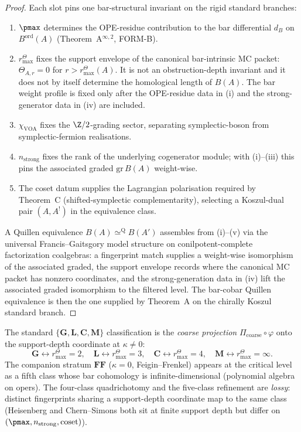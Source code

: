 \begin{proof}
Each slot pins one bar-structural invariant on the rigid standard
branches:
\begin{enumerate}
 \item[(i)] $\pmax$ determines the OPE-residue contribution to the bar differential $d_B$ on $B^{\mathrm{ord}}(A)$ (Theorem~A$^{\infty,2}$, FORM-B).
 \item[(ii)] \(r^\Theta_{\max}\) fixes the support envelope of the
 canonical bar-intrinsic MC packet:
 \(\Theta_{A,r}=0\) for \(r>r^\Theta_{\max}(A)\).  It is not an
 obstruction-depth invariant and it does not by itself determine the
 homological length of \(B(A)\).  The bar weight profile is fixed only
 after the OPE-residue data in (i) and the strong-generator data in
 (iv) are included.
 \item[(iii)] $\chi_{\mathrm{VOA}}$ fixes the $\Z/2$-grading sector, separating symplectic-boson from symplectic-fermion realisations.
 \item[(iv)] $n_{\mathrm{strong}}$ fixes the rank of the underlying cogenerator module; with (i)--(iii) this pins the associated graded $\mathrm{gr}\, B(A)$ weight-wise.
 \item[(v)] The coset datum supplies the Lagrangian polarisation required by Theorem~C (shifted-symplectic complementarity), selecting a Koszul-dual pair $(A, A^!)$ in the equivalence class.
\end{enumerate}
A Quillen equivalence $B(A) \simeq^{\mathrm{Q}} B(A')$ assembles from
(i)--(v) via the universal Francis--Gaitsgory model structure on
conilpotent-complete factorization coalgebras: a fingerprint match
supplies a weight-wise isomorphism of the associated graded, the
support envelope records where the canonical MC packet has nonzero
coordinates, and the strong-generation data in (iv) lift the associated
graded isomorphism to the filtered level. The bar-cobar Quillen
equivalence is then the one supplied by Theorem~A on the chirally
Koszul standard branch.
\end{proof}

\begin{remark}
\label{rem:five-class-coarse-projection}
The standard $\{\mathbf{G},\mathbf{L},\mathbf{C},\mathbf{M}\}$ classification is the \emph{coarse projection} $\Pi_{\mathrm{coarse}} \circ \varphi$ onto the support-depth coordinate at $\kappa \neq 0$:
\[
 \mathbf{G} \leftrightarrow r^\Theta_{\max} = 2, \quad
 \mathbf{L} \leftrightarrow r^\Theta_{\max} = 3, \quad
 \mathbf{C} \leftrightarrow r^\Theta_{\max} = 4, \quad
 \mathbf{M} \leftrightarrow r^\Theta_{\max} = \infty.
\]
The companion stratum $\mathbf{FF}$ ($\kappa = 0$, Feigin--Frenkel) appears at the critical level as a fifth class whose bar cohomology is infinite-dimensional (polynomial algebra on opers). The four-class quadrichotomy and the five-class refinement are \emph{lossy}: distinct fingerprints sharing a support-depth coordinate map to the same class (Heisenberg and Chern--Simons both sit at finite support depth but differ on $(\pmax, n_{\mathrm{strong}}, \mathrm{coset})$).
\end{remark}

